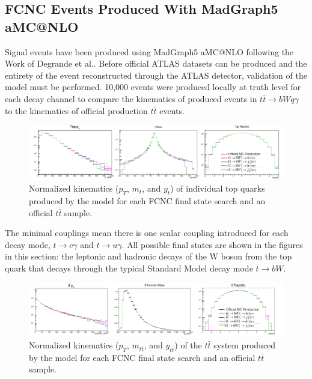 \subsection{FCNC Events Produced With MadGraph5 aMC@NLO}

Signal events have been produced using MadGraph5 aMC@NLO following the Work of Degrande et al.\cite{Degrande:2014tta}.  Before official ATLAS datasets can be produced and the entirety of the event reconstructed through the ATLAS detector, validation of the model must be performed.  10,000 events were produced locally at truth level for each decay channel to compare the kinematics of produced events in $t\bar{t}\rightarrow bWq\gamma$ to the kinematics of official production $t\bar{t}$ events. 

\begin{figure}[h!]
	\centering
	\includegraphics[width=\columnwidth]{../ThesisImages/FCNCValidation/singleTops.png}
	\caption{ Normalized kinematics ($p_T$, $m_t$, and $y_t$) of individual top quarks produced by the model for each FCNC final state search and an official $t\bar{t}$ sample.
	}
\end{figure}


The minimal couplings mean there is one scalar coupling introduced for each decay mode, $t\rightarrow c\gamma$ and $t\rightarrow u\gamma$.  All possible final states are shown in the figures in this section: the leptonic and hadronic decays of the W boson from the top quark that decays through the typical Standard Model decay mode $t\rightarrow bW$. 

\begin{figure}[h!]
	\centering
	\includegraphics[width=\columnwidth]{../ThesisImages/FCNCValidation/ttBarSys.png}
	\caption{Normalized kinematics ($p_T$, $m_{t\bar{t}}$, and $y_{t\bar{t}}$) of the $t\bar{t}$ system produced by the model for each FCNC final state search and an official $t\bar{t}$ sample.
	}
\end{figure}

